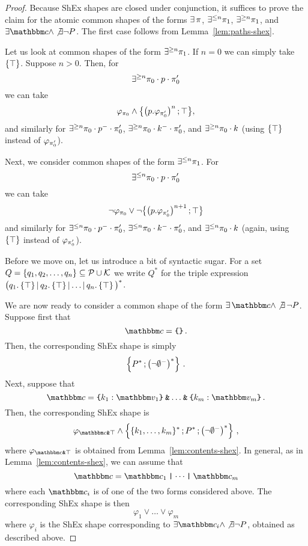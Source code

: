 \begin{proof} 
Because ShEx shapes are closed under conjunction, it suffices to prove the claim for the atomic common shapes of the forms $\exists\, \pi$, $\exists^{\leq n}\pi_1$, $\exists^{\geq n}\pi_1$, and $\exists \ntype \land \not\exists\lnot P$. The first case follows from Lemma~\ref{lem:paths-shex}. 

Let us look at common shapes of the form $\exists^{\geq n}\pi_1$. If $n=0$ we can simply take $\left\{ \top \right\}$. Suppose $n>0$. Then, for \[\exists^{\geq n} \pi_0\cdot p\cdot \pi'_0\] we can take 
\[\varphi_{\pi_0} \land \big\{\big(p. \varphi_{\pi'_0}\big)^{n}\mathop{;} \top\big\},\] and similarly for $\exists^{\geq n}\pi_0\cdot p^{-}\cdot \pi'_0$, $\exists^{\geq n}\pi_0\cdot k^{-}\cdot \pi'_0$, and $\exists^{\geq n}\pi_0\cdot k$ (using $\left\{ \top \right\}$ instead of $\varphi_{\pi'_0}$).
 
Next, we consider common shapes of the form 
$\exists^{\leq n}\pi_1$. For \[\exists^{\leq n} \pi_0\cdot p\cdot \pi'_0\] we can take \[\lnot\varphi_{\pi_0} \lor \lnot 
\big\{\big(p.\varphi_{\pi'_0}\big)^{n+1}\mathop{;} \top\big\}\] and similarly for $\exists^{\leq n}\pi_0\cdot p^{-}\cdot \pi'_0$, $\exists^{\leq n}\pi_0\cdot k^{-}\cdot \pi'_0$, and $\exists^{\leq n}\pi_0\cdot k$ (again, using $\left\{ \top \right\}$ instead of $\varphi_{\pi'_0}$). 

Before we move on, let us introduce a bit of syntactic sugar. For a set $Q = \{q_1, q_2, \dots, q_n\}\subseteq \mathcal{P} \cup \mathcal{K}$ we write $Q^{*}$ for the triple expression
$\big(q_1.\left\{ \top \right\} \mathop{|} q_2.\left\{ \top \right\} \mathop{|} \dots \mathop{|} q_n.\left\{ \top \right\}\big)^{*}$. 

We are now ready to consider a common shape of the form $\exists\, \ntype \land \not\exists\,\lnot P$. Suppose first that 
\[\ntype = \closedRT{}\,.\] 
Then, the corresponding ShEx shape is simply 
\[\left\{ P^{*} \mathop{;} \big(\lnot\emptyset^{-}\big)^{*} \right\}\,.\] 
Next, suppose that \[\ntype = \closedRT{k_1:\vtype_1}\tAnd \dots \tAnd \closedRT{k_m :\vtype_m}\,.\] 
Then, the corresponding ShEx shape is 
\[
\varphi_{\ntype\tAnd\top} \land \shexneigh{\{k_1, \dots,k_m\}^{*}\shexeach P^{*} \shexeach \big(\lnot\emptyset^{-}\big)^{*}} \,,\]
where $\varphi_{\ntype\tAnd\top}$ is obtained from Lemma~\ref{lem:contents-shex}.
In general, as in Lemma~\ref{lem:contents-shex}, we can assume that 
\[\ntype = \ntype_1 \tOr \dots \tOr \ntype_m\] where each $\ntype_i$ is of one of the two forms considered above. The corresponding ShEx shape is then 
\[\varphi_1 \lor \dots \lor \varphi_m\] where $\varphi_i$ is the ShEx shape corresponding to $\exists \ntype_i \land \not\exists\lnot P$, obtained as described above. 
\end{proof}


